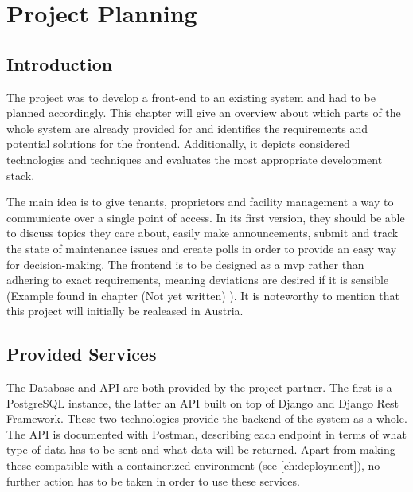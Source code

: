 \chapter[Project Planning]{Project Planning}

\section{Introduction}
The project was to develop a front-end to an existing system and had to be planned accordingly. This chapter will give an overview about which parts of the whole system are already provided for and identifies the requirements and potential solutions for the frontend. Additionally, it depicts considered technologies and techniques and evaluates the most appropriate development stack.

The main idea is to give tenants, proprietors and facility management a way to communicate over a single point of access. In its first version, they should be able to discuss topics they care about, easily make announcements, submit and track the state of maintenance issues and create polls in order to provide an easy way for decision-making. The frontend is to be designed as a \acrfull{mvp} rather than adhering to exact requirements, meaning deviations are desired if it is sensible (Example found in chapter (Not yet written) ). It is noteworthy to mention that this project will initially be realeased in Austria.

\section{Provided Services}
The Database and API are both provided by the project partner. The first is a PostgreSQL instance, the latter an API built on top of Django and Django Rest Framework. These two technologies provide the backend of the system as a whole. The API is documented with Postman, describing each endpoint in terms of what type of data has to be sent and what data will be returned. Apart from making these compatible with a containerized environment (see \autoref{ch:deployment}), no further action has to be taken in order to use these services.


